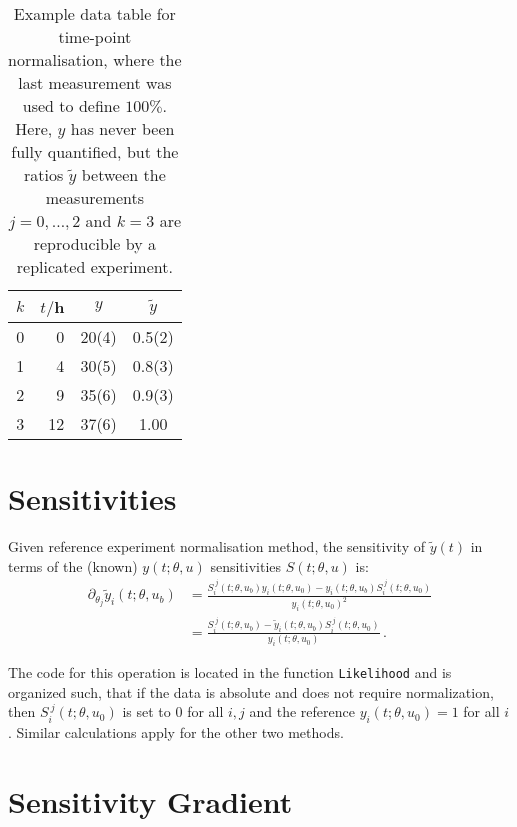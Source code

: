 \documentclass[utf8,english]{scrartcl}
\begin{document}
\begin{table}
  \centering\ttfamily
  \begin{tabular}{crcc}
    \toprule
    $k$&$t/$h&$y$&$\tilde y$\\
    \midrule
    0&0&20(4)&0.5(2)\\
    1&4&30(5)&0.8(3)\\
    2&9&35(6)&0.9(3)\\
   3&12&37(6)&1.00\\
    \bottomrule
  \end{tabular}
  \caption{Example data table for time-point normalisation, where the last measurement was used to define $100\%$. Here, $y$ has never been fully quantified, but the ratios $\tilde y$ between the measurements $j=0,\dots,2$ and $k=3$ are reproducible by a replicated experiment.}
  \label{tab:norm_t}
\end{table}

\section{Sensitivities}
\label{sec:sens}

Given reference experiment normalisation method, the sensitivity of
$\tilde y(t)$ in terms of the (known) $y(t;\theta,u)$ sensitivities
$S(t;\theta,u)$ is:
\begin{align}
  \partial_{\theta_j} \tilde y_i(t;\theta,u_b) 
  &= \frac{S_i^{~j}(t;\theta,u_b)y_i(t;\theta,u_0)
    -y_i(t;\theta,u_b)S_i^{~j}(t;\theta,u_0)}{y_i(t;\theta,u_0)^2}\nonumber\\
  &= \frac{S_i^{~j}(t;\theta,u_b) 
    - \tilde y_i(t;\theta,u_b)S_i^{~j}(t;\theta,u_0)}{y_i(t;\theta,u_0)}\,.  \label{eq:fyS}
\end{align}

The code for this operation is located in the function
\texttt{Likelihood} and is organized such, that if the data is
absolute and does not require normalization, then
$S_i^{~j}(t;\theta,u_0)$ is set to $0$ for all $i,j$ and the reference
$y_i(t;\theta,u_0)=1$ for all $i$.
Similar calculations apply for the other two methods.

\section{Sensitivity Gradient}
\label{sec:dS}
\end{document}
